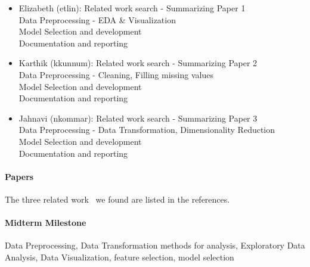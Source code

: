 \documentclass{article}
\begin{document}
\begin{itemize}
  \item Elizabeth (etlin):
  Related work search - Summarizing Paper 1 \\
  Data Preprocessing - EDA \& Visualization \\
  Model Selection and development \\
  Documentation and reporting
  
  \item Karthik (kkunnum):
  Related work search - Summarizing Paper 2 \\
  Data Preprocessing - Cleaning, Filling missing values \\
  Model Selection and development\\
  Documentation and reporting
  
  \item Jahnavi (nkommar):
  Related work search - Summarizing Paper 3\\
  Data Preprocessing - Data Transformation, Dimensionality Reduction\\
  Model Selection and development\\
  Documentation and reporting
  
\end{itemize}


\paragraph{Papers} 
The three related work~\cite{kumar2007bankruptcy,olson2012comparative,shi2019overview} we found are listed in the references.

\paragraph{Midterm Milestone}
Data Preprocessing, Data Transformation methods for analysis, Exploratory Data Analysis, Data Visualization, feature selection, model selection




\end{document}
